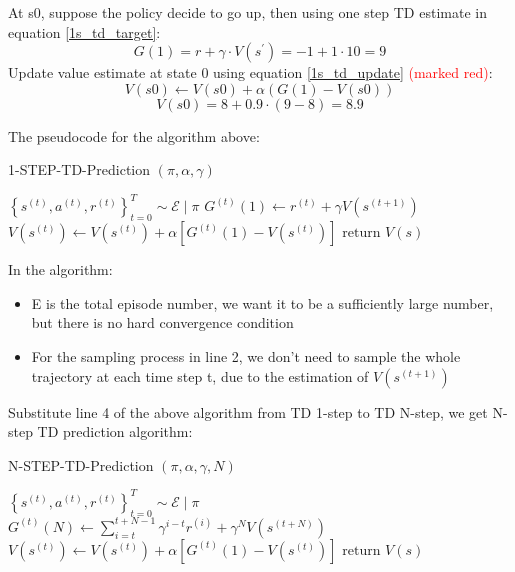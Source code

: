 \documentclass[11pt]{article}
\begin{document}
At s0, suppose the policy decide to go up, then using one step TD estimate in equation \ref{1s_td_target}:
\[ G(1) = r + \gamma \cdot V(s^\prime) = -1 + 1 \cdot 10 = 9 \]
Update value estimate at state 0 using equation \ref{1s_td_update} \textcolor{red}{(marked red)}:
\[ V(s0) \leftarrow V(s0) + \alpha (G(1) - V(s0)) \]
\[ V(s0) = 8 + 0.9 \cdot (9-8) = 8.9 \]

The pseudocode for the algorithm above:
\begin{algorithm}[H]
\caption{1-STEP-TD-Prediction $(\pi,\alpha,\gamma)$}
\label{algo:1std}
\begin{algorithmic}[1]
    \State $\left\{s^{(t)}, a^{(t)}, r^{(t)}\right\}_{t=0}^{T} \sim \mathcal{E} \mid \pi$
        \State $G^{(t)}\left(1\right) \leftarrow r^{(t)} + \gamma V(s^{(t+1)})$
        \State $V(s^{(t)}) \leftarrow V(s^{(t)}) + \alpha \left[ G^{(t)}(1) - V(s^{(t)}) \right]$
    \EndFor
\EndFor
\State $\text{return } V(s) $
\end{algorithmic}
\end{algorithm}
In the algorithm:
\begin{itemize}
    \item E is the total episode number, we want it to be a sufficiently large number, but there is no hard convergence condition
    \item For the sampling process in line 2, we don't need to sample the whole trajectory at each time step t, due to the estimation of $V(s^{(t+1)})$
\end{itemize}

Substitute line 4 of the above algorithm from TD 1-step to TD N-step, we get N-step TD prediction algorithm:
\begin{algorithm}[H]
\caption{N-STEP-TD-Prediction $(\pi,\alpha,\gamma,N)$}
\label{algo:1std}
\begin{algorithmic}[1]
    \State $\left\{s^{(t)}, a^{(t)}, r^{(t)}\right\}_{t=0}^{T} \sim \mathcal{E} \mid \pi$
        \State $G^{(t)}\left(N\right) \leftarrow \sum_{i=t}^{t+N-1} \gamma^{i-t} r^{(i)} + \gamma^N V(s^{(t+N)})$
        \State $V(s^{(t)}) \leftarrow V(s^{(t)}) + \alpha \left[ G^{(t)}(1) - V(s^{(t)}) \right]$
    \EndFor
\EndFor
\State $\text{return } V(s) $
\end{algorithmic}
\end{algorithm}
\end{document}
